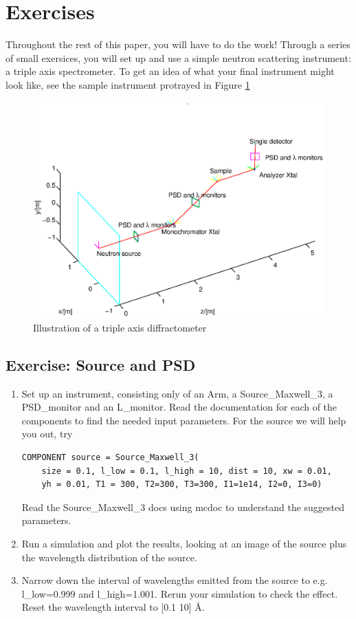 \documentclass[a4paper]{article}
\begin{document}
\section{Exercises}
Throughout the rest of this paper, you will have to do the work!
Through a series of small exersices, you will set up and use a simple
neutron scattering instrument: a triple axis spectrometer. To get an idea of what your final
instrument might look like, see the sample instrument protrayed in Figure \ref{instr.eps}
\begin{figure}[htb!]
\begin{center}
\includegraphics[width=12cm]{pics/instr.eps}
\end{center}
\caption{Illustration of a triple axis diffractometer}
\label{instr.eps}
\end{figure}
\subsection{Exercise: Source and PSD}
\begin{enumerate}
\item{Set up an instrument, consisting only of an Arm, a Source\_Maxwell\_3,
a PSD\_monitor and an L\_monitor. Read the documentation for each of
the components to find the needed input parameters. For the source we
will help you out, try
\begin{verbatim}
COMPONENT source = Source_Maxwell_3(
    size = 0.1, l_low = 0.1, l_high = 10, dist = 10, xw = 0.01,
    yh = 0.01, T1 = 300, T2=300, T3=300, I1=1e14, I2=0, I3=0)
\end{verbatim}
Read the Source\_Maxwell\_3 docs using mcdoc to understand the
suggested parameters. }
\item{Run a simulation and plot the results, looking
at an image of the source plus the wavelength distribution of the
source. }
\item{Narrow down the interval of wavelengths emitted from the
source to e.g. l\_low=0.999 and l\_high=1.001. Rerun your simulation to
check the effect. Reset the wavelength interval to [0.1 10] \AA.}
\end{enumerate}
\end{document}
